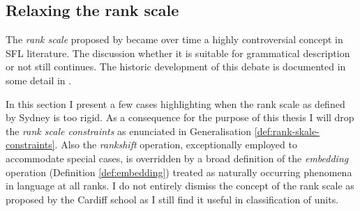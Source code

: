 \subsection{Relaxing the rank scale}
\label{sec:rank-system}

The \textit{rank scale} proposed by \citet{Halliday2002} became over time a highly controversial concept in SFL literature. The discussion whether it is suitable for grammatical description or not still continues. The historic development of this debate is documented in some detail in \citet[309--338]{Fawcett2000}. %



In this section I present a few cases highlighting when the rank scale as defined by Sydney is too rigid. As a consequence for the purpose of this thesis I will drop the \textit{rank scale constraints} as enunciated in Generalisation \ref{def:rank-skale-constraints}. Also the \textit{rankshift} operation, exceptionally employed to accommodate special cases, is overridden by a broad definition of the \textit{embedding}  operation (Definition \ref{def:embedding}) treated as naturally occurring phenomena in language at all ranks. I do not entirely dismiss the concept of the rank scale as proposed by the Cardiff school as I still find it useful in classification of units.

